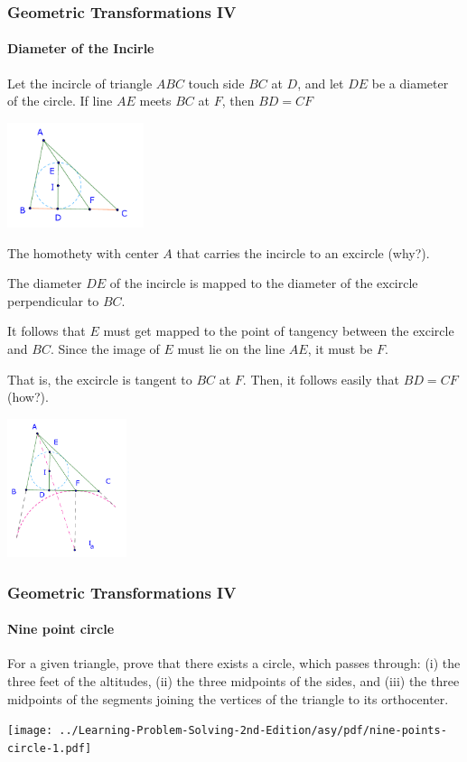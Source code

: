 \documentclass[8pt,xcolor=table,dvipsnames]{beamer}
\begin{document}
\begin{frame}[t]
    \frametitle{Geometric Transformations IV}
    \framesubtitle{Diameter of the Incirle}
    \begin{example}
        Let the incircle of triangle $ABC$ touch side $BC$ at $D$, and let $DE$ be a diameter of the circle.
        If line $AE$ meets $BC$ at $F$, then $BD = CF$
    \end{example}
    \begin{overprint}
        \begin{center}
            \includegraphics[width=4cm]{./svg/pdf/diameter-incircle-1.pdf}
        \end{center}
        The homothety with center $A$ that carries the incircle to an excircle (why?).

        The diameter $DE$ of the incircle is mapped to the diameter of the excircle perpendicular to $BC$.

        It follows that $E$ must get mapped to the point of tangency between the excircle and $BC$.
        Since the image of $E$ must lie on the line $AE$, it must be $F$.

        That is, the excircle is tangent to $BC$ at $F.$ Then, it follows easily that $BD=CF$ (how?).
        \begin{center}
            \includegraphics[width=3.5cm]{./svg/pdf/diameter-incircle-2.pdf}
        \end{center}
    \end{overprint}
\end{frame}

\begin{frame}[t]
    \frametitle{Geometric Transformations IV}
    \framesubtitle{Nine point circle}
    \begin{example}
        For a given triangle, prove that there exists a circle, which passes through:
        (i) the three feet of the altitudes, (ii) the three midpoints of the sides,
        and (iii) the three midpoints of the segments joining the vertices of the triangle to its orthocenter.
    \end{example}
    \begin{center}
        \texttt{[image: ../Learning-Problem-Solving-2nd-Edition/asy/pdf/nine-points-circle-1.pdf]}
    \end{center}
\end{frame}
\end{document}
